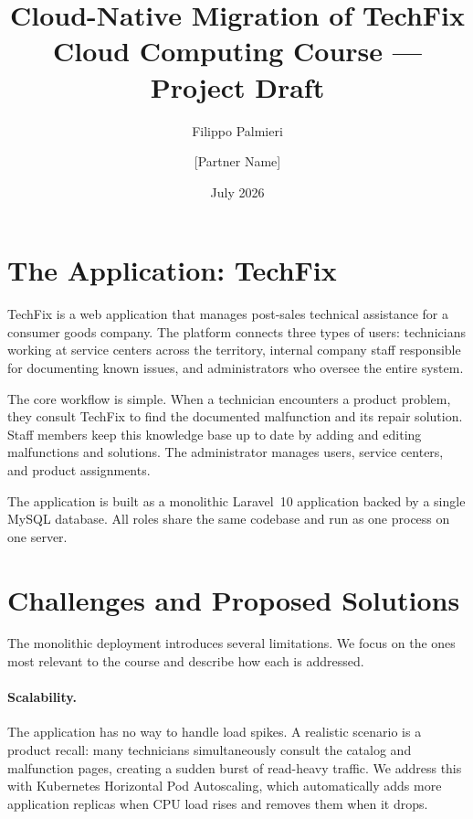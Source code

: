 \documentclass[12pt,a4paper]{article}
\title{
    \vspace{-1cm}
    \Large\textbf{Cloud-Native Migration of TechFix}\\[0.4em]
    \normalsize Cloud Computing Course --- Project Draft
}
\author{Filippo Palmieri \and [Partner Name]}
\date{July 2026}
\begin{document}
\maketitle
\thispagestyle{fancy}

\section{The Application: TechFix}

TechFix is a web application that manages post-sales technical assistance for a consumer goods company. The platform connects three types of users: technicians working at service centers across the territory, internal company staff responsible for documenting known issues, and administrators who oversee the entire system.

The core workflow is simple. When a technician encounters a product problem, they consult TechFix to find the documented malfunction and its repair solution. Staff members keep this knowledge base up to date by adding and editing malfunctions and solutions. The administrator manages users, service centers, and product assignments.

The application is built as a monolithic Laravel~10 application backed by a single MySQL database. All roles share the same codebase and run as one process on one server.

\section{Challenges and Proposed Solutions}

The monolithic deployment introduces several limitations. We focus on the ones most relevant to the course and describe how each is addressed.

\paragraph{Scalability.} The application has no way to handle load spikes. A realistic scenario is a product recall: many technicians simultaneously consult the catalog and malfunction pages, creating a sudden burst of read-heavy traffic. We address this with Kubernetes Horizontal Pod Autoscaling, which automatically adds more application replicas when CPU load rises and removes them when it drops.
\end{document}
